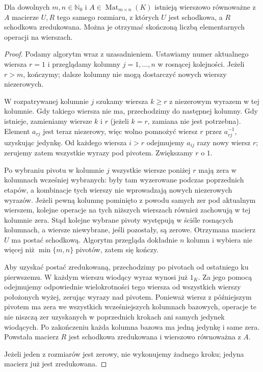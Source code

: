 \begin{twierdzenie}
\label{thm:lin5-gauss}
Dla dowolnych \(m,n\in\mathbb N_0\)
i \(A\in\operatorname{Mat}_{m\times n}(K)\)
istnieją wierszowo równoważne z \(A\)
macierze \(U,R\) tego samego rozmiaru,
z których \(U\) jest schodkowa,
a \(R\) schodkowa zredukowana.
Można je otrzymać skończoną liczbą
elementarnych operacji na wierszach.
\end{twierdzenie}
\begin{proof}
Podamy algorytm wraz z uzasadnieniem.
Ustawiamy numer aktualnego wiersza \(r=1\)
i przeglądamy kolumny \(j=1,\ldots,n\)
w rosnącej kolejności. Jeżeli \(r>m\),
kończymy; dalsze kolumny nie mogą
dostarczyć nowych wierszy niezerowych.

W rozpatrywanej kolumnie \(j\) szukamy
wiersza \(k\geq r\) z niezerowym wyrazem
w tej kolumnie. Gdy takiego wiersza nie ma,
przechodzimy do następnej kolumny.
Gdy istnieje, zamieniamy wiersze \(k\) i \(r\)
(jeżeli \(k=r\), zamiana nie jest potrzebna).
Element \(a_{rj}\) jest teraz niezerowy,
więc wolno pomnożyć wiersz \(r\)
przez \(a_{rj}^{-1}\), uzyskując jedynkę.
Od każdego wiersza \(i>r\) odejmujemy
\(a_{ij}\) razy nowy wiersz \(r\);
zerujemy zatem wszystkie wyrazy pod pivotem.
Zwiększamy \(r\) o \(1\).

Po wybraniu pivotu w kolumnie \(j\)
wszystkie wiersze poniżej \(r\) mają zera
w kolumnach wcześniej wybranych:
były tam wyzerowane podczas poprzednich
etapów, a kombinacje tych wierszy
nie wprowadzają nowych niezerowych wyrazów.
Jeżeli pewną kolumnę pominięto z powodu
samych zer pod aktualnym wierszem,
kolejne operacje na tych niższych wierszach
również zachowują w tej kolumnie zera.
Stąd kolejne wybrane pivoty występują
w ściśle rosnących kolumnach,
a wiersze niewybrane, jeśli pozostały,
są zerowe. Otrzymana macierz \(U\)
ma postać schodkową. Algorytm przegląda
dokładnie \(n\) kolumn i wybiera nie więcej
niż \(\min\{m,n\}\) pivotów, zatem się kończy.

Aby uzyskać postać zredukowaną, przechodzimy
po pivotach od ostatniego ku pierwszemu.
W każdym wierszu wiodący wyraz wynosi już \(1_K\).
Za jego pomocą odejmujemy odpowiednie
wielokrotności tego wiersza od wszystkich
wierszy położonych wyżej, zerując wyrazy
nad pivotem. Ponieważ wiersz z późniejszym
pivotem ma zera we wszystkich wcześniejszych
kolumnach bazowych, operacje te nie niszczą
zer uzyskanych w poprzednich krokach
ani samych jedynek wiodących.
Po zakończeniu każda kolumna bazowa ma
jedną jedynkę i same zera. Powstała
macierz \(R\) jest schodkowa zredukowana
i wierszowo równoważna z \(A\).

Jeżeli jeden z rozmiarów jest zerowy,
nie wykonujemy żadnego kroku;
jedyna macierz już jest zredukowana.
\end{proof}

